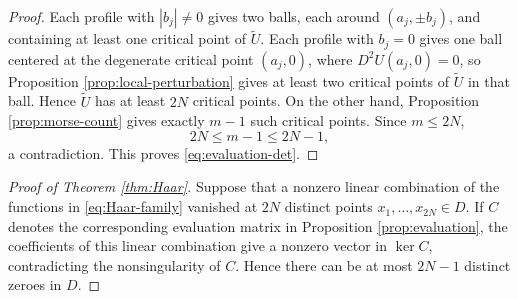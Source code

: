 \documentclass[leqno,11pt]{amsart}
\numberwithin{equation}{section}
\theoremstyle{definition}
\begin{document}
\begin{proof}
		Each profile with $|b_j| \neq 0$ gives two balls, each around $(a_j,\pm b_j)$, and containing at least one critical point of $\widetilde U$. Each profile with $b_j=0$ gives one ball centered at the degenerate critical point $(a_j,0)$, where $D^2U(a_j,0)=0$, so Proposition \ref{prop:local-perturbation} gives at least two critical points of $\widetilde U$ in that ball. Hence $\widetilde U$ has at least $2N$ critical points. On the other hand, Proposition \ref{prop:morse-count} gives exactly $m-1$ such critical points. Since $m\leq2N$,
		\[
		2N\leq m-1\leq2N-1,
		\]
		a contradiction. This proves \eqref{eq:evaluation-det}.
	\end{proof}
	
	\begin{proof}[Proof of Theorem \ref{thm:Haar}]
		Suppose that a nonzero linear combination of the functions in \eqref{eq:Haar-family} vanished at $2N$ distinct points $x_1,\ldots,x_{2N}\in D$. If $C$ denotes the corresponding evaluation matrix in Proposition \ref{prop:evaluation}, the coefficients of this linear combination give a nonzero vector in $\ker C$, contradicting the nonsingularity of $C$. Hence there can be at most $2N-1$ distinct zeroes in $D$.
	\end{proof}
	
	

	
	
\end{document}

